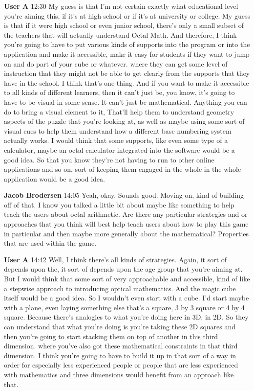 \documentclass{article}
\begin{document}
\noindent \textbf{User A}   12:30
My guess is that I'm not certain exactly what educational level you're aiming this, if it's at high school or if it's at university or college. My guess is that if it were high school or even junior school, there's only a small subset of the
teachers that will actually understand Octal Math. And therefore, I think you're going to have to put various kinds of supports into the program or into the application and make it accessible, make it easy for students if they want to jump on and do part of your cube or whatever.
where they can get some level of instruction that they might not be able to get clearly from the supports that they have in the school. I think that's one thing. And if you want to make it accessible to all kinds of different learners, then it can't just be, you know, it's going to have to be visual in some sense. It can't just be mathematical. Anything you can do to bring a visual element to it,
That'll help them to understand geometry aspects of the puzzle that you're looking at, as well as maybe using some sort of visual cues to help them understand how a different base numbering system actually works. I would think that some supports, like even some type of a calculator, maybe an octal calculator integrated into the software would be a good idea.
So that you know they're not having to run to other online applications and so on, sort of keeping them engaged in the whole in the whole application would be a good idea.

\noindent \textbf{Jacob Brodersen}   14:05
Yeah, okay.
Sounds good.
Moving on, kind of building off of that.
I know you talked a little bit about maybe like something to help teach the users about octal arithmetic. Are there any particular strategies and or approaches that you think will best help teach users about how to play this game in particular and then maybe more generally about the mathematical?
Properties that are used within the game.

\noindent \textbf{User A}   14:42
Well, I think there's all kinds of strategies. Again, it sort of depends upon the, it sort of depends upon the age group that you're aiming at. But I would think that some sort of very approachable and accessible, kind of like a stepwise approach to introducing optical mathematics.
And the magic cube itself would be a good idea. So I wouldn't even start with a cube. I'd start maybe with a plane, even laying something else that's a square, 3 by 3 square or 4 by 4 square. Because there's analogies to what you're doing here in 3D, in 2D. So they can understand that what you're doing is you're taking these 2D squares and then you're going to start stacking them on top of another in this third dimension.
where you've also got these mathematical constraints in that third dimension. I think you're going to have to build it up in that sort of a way in order for especially less experienced people or people that are less experienced with mathematics and three dimensions would benefit from an approach like that.
\end{document}
